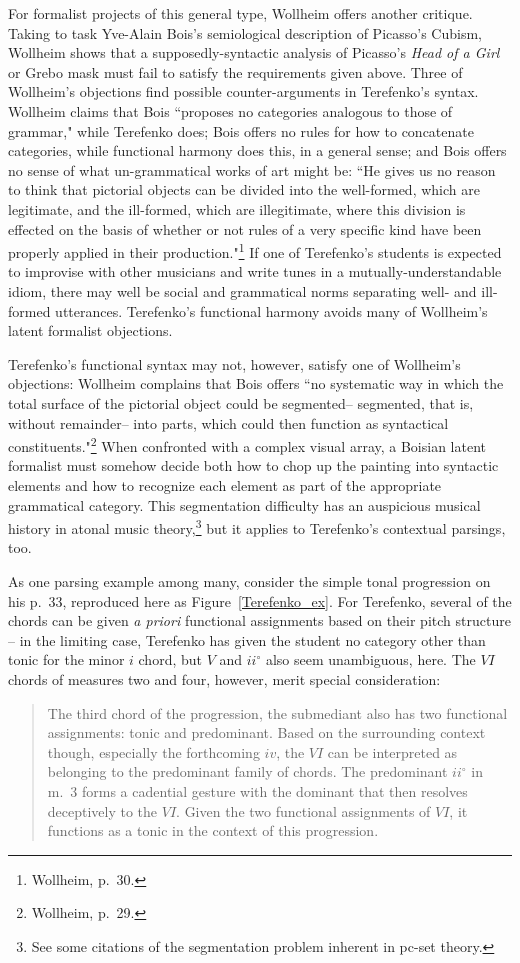 For formalist projects of this general type, Wollheim offers another critique.  Taking to task Yve-Alain Bois's semiological description of Picasso's Cubism, Wollheim shows that a supposedly-syntactic analysis of Picasso's \emph{Head of a Girl} or Grebo mask must fail to satisfy the requirements given above.  Three of Wollheim's objections find possible counter-arguments in Terefenko's syntax.  Wollheim claims that Bois ``proposes no categories analogous to those of grammar," while Terefenko does; Bois offers no rules for how to concatenate categories, while functional harmony does this, in a general sense; and Bois offers no sense of what un-grammatical works of art might be: ``He gives us no reason to think that pictorial objects can be divided into the well-formed, which are legitimate, and the ill-formed, which are illegitimate, where this division is effected on the basis of whether or not rules of a very specific kind have been properly applied in their production."\footnote{Wollheim, p.\ 30.}  If one of Terefenko's students is expected to improvise with other musicians and write tunes in a mutually-understandable idiom, there may well be social and grammatical norms separating well- and ill-formed utterances.  Terefenko's functional harmony avoids many of Wollheim's latent formalist objections.

Terefenko's functional syntax may not, however, satisfy one of Wollheim's objections:  Wollheim complains that Bois offers ``no systematic way in which the total surface of the pictorial object could be segmented-- segmented, that is, without remainder-- into parts, which could then function as syntactical constituents."\footnote{Wollheim, p.\ 29.}  When confronted with a complex visual array, a Boisian latent formalist must somehow decide both how to chop up the painting into syntactic elements and how to recognize each element as part of the appropriate grammatical category.  This segmentation difficulty has an auspicious musical history in atonal music theory,\footnote{See some citations of the segmentation problem inherent in pc-set theory.} but it applies to Terefenko's contextual parsings, too.

As one parsing example among many, consider the simple tonal progression on his p.\ 33, reproduced here as Figure~\ref{Terefenko_ex}.  For Terefenko, several of the chords can be given \emph{a priori} functional assignments based on their pitch structure -- in the limiting case, Terefenko has given the student no category other than tonic for the minor $i$ chord, but $V$ and $ii^\circ$ also seem unambiguous, here.  The $VI$ chords of measures two and four, however, merit special consideration:
\begin{quote}
The third chord of the progression, the submediant also has two functional assignments: tonic and predominant.  Based on the surrounding context though, especially the forthcoming $iv$, the $VI$ can be interpreted as belonging to the predominant family of chords.  The predominant $ii^{\circ}$ in m.\ 3 forms a cadential gesture with the dominant that then resolves deceptively to the $VI$.  Given the two functional assignments of $VI$, it functions as a tonic in the context of this progression.
\end{quote}

